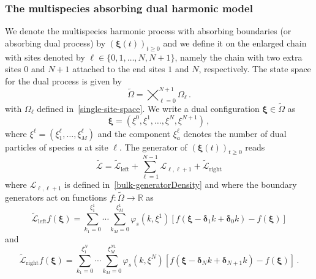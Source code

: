 \documentclass[11pt]{article}
\numberwithin{equation}{section}
\newcommand{\M}{M}
\newcommand{\N}{N}
\begin{document}
\subsubsection{The multispecies absorbing dual harmonic model} We denote the multispecies harmonic process with absorbing boundaries (or absorbing dual process) by $(\bm{\xi}(t))_{t\geq 0}$ and we define it on the enlarged chain with sites denoted by $\ell\in\{0,1,\ldots,\N,\N+1\}$, namely the chain with two extra sites $0$ and $\N+1$ attached to the end sites $1$ and $\N$, respectively. The state space for the dual process is given by
\begin{equation}
	\widetilde{\Omega}=\bigtimes_{\ell =0}^{\N+1}\Omega_{\ell }\,.
\end{equation}
with $\Omega_{\ell}$ defined in~\eqref{single-site-space}. We write a dual configuration $\bm{\xi}\in \widetilde{\Omega}$ as 
\begin{equation}
	\bm{\xi}=(\xi^0,\xi^{1},\ldots,\xi^{\N},\xi^{\N+1})\,,
\end{equation}
where $\xi^{\ell}=(\xi_1^{\ell},\ldots,\xi_{\M}^{\ell})$ and the component $\xi_{a}^{\ell}$ denotes the number of dual particles of species $a$ at site $\ell$. The generator of $(\bm{\xi}(t))_{t\geq 0}$ reads 
\begin{equation}\label{abs-Harmonic-Generator}
		\widetilde{\mathcal{L}}=\widetilde{\mathcal{L}}_{\text{left}}+\sum_{\ell=1}^{N-1}\mathcal{L}_{\ell,\ell+1}+\widetilde{\mathcal{L}}_{\text{right}}
	\end{equation}
    where $\mathcal{L}_{\ell,\ell+1}$ is  defined in~\eqref{bulk-generatorDensity} and where the boundary generators act on functions $f:\widetilde{\Omega}\to \mathbb{R}$ as
	\begin{equation}
		\widetilde{\mathcal{L}}_{\text{left}}f(\bm{\xi})=\sum_{k_{1}=0}^{\xi^{1}_{1}}\cdots \sum_{k_{\M}=0}^{\xi^{1}_{\M}}\varphi_{s}(k,\xi^{1})\left[f(\bm{\xi}-\bm{\delta}_{1}k+\bm{\delta}_{0}k)-f(\bm{\xi})\right]
	\end{equation}
    and
    \begin{equation}
		\widetilde{\mathcal{L}}_{\text{right}}f(\bm{\xi})=\sum_{k_{1}=0}^{\xi^{\N}_{1}}\cdots \sum_{k_{\M}=0}^{\xi^{\N1}_{\M}}\varphi_{s}(k,\xi^{\N})\left[f(\bm{\xi}-\bm{\delta}_{\N}k+\bm{\delta}_{\N+1}k)-f(\bm{\xi})\right]\,.
	\end{equation} 
\end{document}
